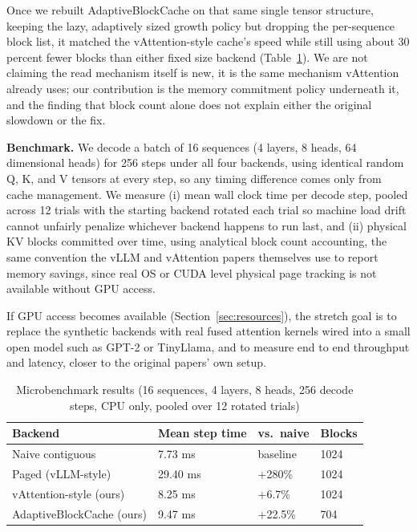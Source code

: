 \documentclass[lettersize,journal]{IEEEtran}
\begin{document}
Once we rebuilt AdaptiveBlockCache on that same single tensor structure, keeping the lazy, adaptively sized growth policy but dropping the per-sequence block list, it matched the vAttention-style cache's speed while still using about 30 percent fewer blocks than either fixed size backend (Table~\ref{tab:results}). We are not claiming the read mechanism itself is new, it is the same mechanism vAttention already uses; our contribution is the memory commitment policy underneath it, and the finding that block count alone does not explain either the original slowdown or the fix.

\textbf{Benchmark.} We decode a batch of 16 sequences (4 layers, 8 heads, 64 dimensional heads) for 256 steps under all four backends, using identical random Q, K, and V tensors at every step, so any timing difference comes only from cache management. We measure (i) mean wall clock time per decode step, pooled across 12 trials with the starting backend rotated each trial so machine load drift cannot unfairly penalize whichever backend happens to run last, and (ii) physical KV blocks committed over time, using analytical block count accounting, the same convention the vLLM and vAttention papers themselves use to report memory savings, since real OS or CUDA level physical page tracking is not available without GPU access.

If GPU access becomes available (Section~\ref{sec:resources}), the stretch goal is to replace the synthetic backends with real fused attention kernels wired into a small open model such as GPT-2 or TinyLlama, and to measure end to end throughput and latency, closer to the original papers' own setup.

\begin{table}[!t]
\caption{Microbenchmark results (16 sequences, 4 layers, 8 heads, 256 decode steps, CPU only, pooled over 12 rotated trials)}
\label{tab:results}
\centering
\begin{tabular}{@{}p{2.2cm}p{1.4cm}p{1.3cm}p{1.1cm}@{}}
\toprule
\textbf{Backend} & \textbf{Mean step time} & \textbf{vs.\ naive} & \textbf{Blocks} \\
\midrule
Naive contiguous & 7.73 ms & baseline & 1024 \\
Paged (vLLM-style) & 29.40 ms & +280\% & 1024 \\
vAttention-style (ours) & 8.25 ms & +6.7\% & 1024 \\
AdaptiveBlockCache (ours) & 9.47 ms & +22.5\% & 704 \\
\bottomrule
\end{tabular}
\end{table}
\end{document}
